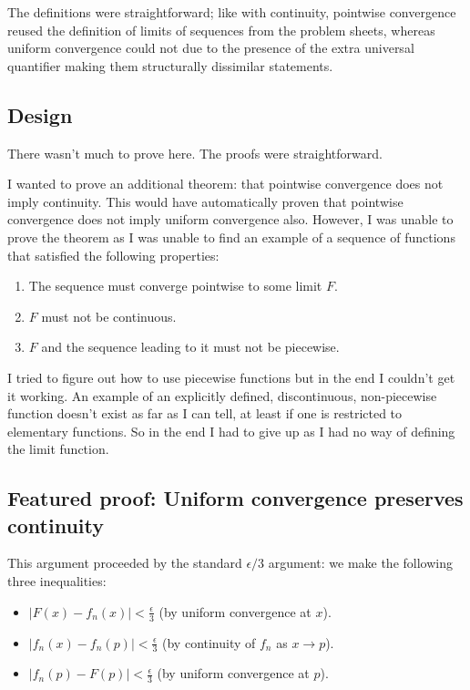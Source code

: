 \documentclass[a4paper, twoside, 11pt]{article}
\theoremstyle{definition}
\theoremstyle{plain}
\theoremstyle{remark}
\begin{document}
The definitions were straightforward; like with continuity, pointwise convergence reused the definition of limits of sequences from the problem sheets, whereas uniform convergence could not due to the presence of the extra universal quantifier making them structurally dissimilar statements.

\subsection*{Design}

There wasn't much to prove here. The proofs were straightforward.

I wanted to prove an additional theorem: that pointwise convergence does not imply continuity. This would have automatically proven that pointwise convergence does not imply uniform convergence also. However, I was unable to prove the theorem as I was unable to find an example of a sequence of functions that satisfied the following properties:

\begin{enumerate}
    \item The sequence must converge pointwise to some limit $F$.
    \item $F$ must not be continuous.
    \item $F$ and the sequence leading to it must not be piecewise.
\end{enumerate}

I tried to figure out how to use piecewise functions but in the end I couldn't get it working. An example of an explicitly defined, discontinuous, non-piecewise function doesn't exist as far as I can tell, at least if one is restricted to elementary functions. So in the end I had to give up as I had no way of defining the limit function.

\subsection{Featured proof: Uniform convergence preserves continuity}

This argument proceeded by the standard $\epsilon/3$ argument: we make the following three inequalities:

\begin{itemize}
    \item $|F(x) - f_{n}(x)| < \frac{\epsilon}{3}$ (by uniform convergence at $x$).
    \item $|f_{n}(x) - f_{n}(p)| < \frac{\epsilon}{3}$ (by continuity of $f_{n}$ as $x \to p$).
    \item $|f_{n}(p) - F(p)| < \frac{\epsilon}{3}$ (by uniform convergence at $p$).
\end{itemize}
\end{document}
